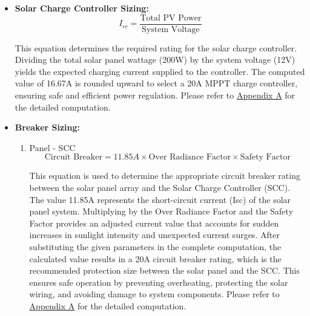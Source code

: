 {\begin{itemize}
 	
 	This formula is used to determine the appropriate inverter size. After calculating the total power requirements of all connected loads, including surge components such as the electric fan, a 20\% allowance is added to ensure that the inverter can safely handle fluctuations and temporary increases in power demand. With a total of 250W, the system requires a 300W pure sine wave inverter. Please refer to \hyperref[appendix:A]{Appendix A} for the detailed computation.
 	
 	\item \textbf{Solar Charge Controller Sizing:} 
 	\begin{equation}
 		I_{cc} =
 		\frac{\text{Total PV Power}}{\text{System Voltage}}
 		\label{eq:solar}
 	\end{equation}
 	
 	
 	This equation determines the required rating for the solar charge controller. Dividing the total solar panel wattage (200W) by the system voltage (12V) yields the expected charging current supplied to the controller. The computed value of 16.67A is rounded upward to select a 20A MPPT charge controller, ensuring safe and efficient power regulation. Please refer to \hyperref[appendix:A]{Appendix A} for the detailed computation.
 	
 	\item \textbf{Breaker Sizing:} 
 	\begin{enumerate}[label=\alph*.]
 		\item Panel - SCC
 		\begin{equation}
 			\text{Circuit Breaker} = 11.85A \times\text{Over Radiance Factor} \times \text{Safety Factor}
 		\end{equation}
 		
 		
 		This equation is used to determine the appropriate circuit breaker rating between the solar panel array and the Solar Charge Controller (SCC). The value 11.85A represents the short-circuit current (Isc) of the solar panel system. Multiplying by the Over Radiance Factor and the Safety Factor provides an adjusted current value that accounts for sudden increases in sunlight intensity and unexpected current surges.
 		After substituting the given parameters in the complete computation, the calculated value results in a 20A circuit breaker rating, which is the recommended protection size between the solar panel and the SCC. This ensures safe operation by preventing overheating, protecting the solar wiring, and avoiding damage to system components. Please refer to \hyperref[appendix:A]{Appendix A} for the detailed computation.
 		

\end{enumerate}
\end{itemize}}
